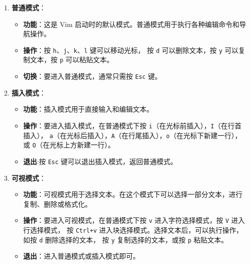 \documentclass[16pt]{lzc}
\begin{document}
        \begin{enumerate}
            \item \textbf{普通模式}：
            \begin{itemize}
                \item \textbf{功能}：这是 Vim 启动时的默认模式。普通模式用于执行各种编辑命令和导航操作。

                \item \textbf{操作}：按 \texttt{h}、\texttt{j}、\texttt{k}、\texttt{l} 键可以移动光标，
                按 \texttt{d} 可以删除文本，按 \texttt{y} 可以复制文本，按 \texttt{p} 可以粘贴文本。

                \item \textbf{切换}：要进入普通模式，通常只需按 \texttt{Esc} 键。
            \end{itemize}

            \item \textbf{插入模式}：
            \begin{itemize}
                \item \textbf{功能}：插入模式用于直接输入和编辑文本。

                \item \textbf{操作}：要进入插入模式，在普通模式下按 \texttt{i}（在光标前插入），\texttt{I}（在行首插入），
                \texttt{a}（在光标后插入），\texttt{A}（在行尾插入），\texttt{o}（在光标下新建一行），或 \texttt{O}（在光标上方新建一行）。

                \item \textbf{退出}:按 \texttt{Esc} 键可以退出插入模式，返回普通模式。
            \end{itemize}

            \item \textbf{可视模式}：
            \begin{itemize}
                \item \textbf{功能}：可视模式用于选择文本。在这个模式下可以选择一部分文本，进行复制、删除或格式化。

                \item \textbf{操作}：要进入可视模式，在普通模式下按 \texttt{v} 进入字符选择模式，按 \texttt{V} 进入行选择模式，
                按 \texttt{Ctrl+v} 进入块选择模式。选择文本后，可以执行操作，如按 \texttt{d} 删除选择的文本，
                按 \texttt{y} 复制选择的文本，或按 \texttt{p} 粘贴文本。

                \item \textbf{退出}：进入普通模式或插入模式即可。
            \end{itemize}
        \end{enumerate}
\end{document}
